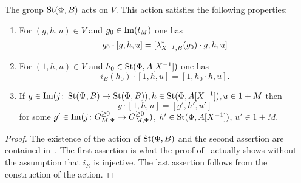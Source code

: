 \begin{prop} \label{prop:horrocks-main} The group $\operatorname{St}(\Phi, B)$ acts on $\overline{V}$.
This action satisfies the following properties:
\begin{enumerate}
    \item For $(g, h, u) \in V$ and $g_0 \in \operatorname{Im}(t_M)$ one has
    \[g_0 \cdot [g, h, u] = [\lambda_{X^{-1}, B}^* (g_0) \cdot g, h, u]\]
    \item For $(1, h, u) \in V$ and $h_0 \in \operatorname{St}(\Phi, A[X^{-1}])$ one has
    \[ i_B(h_0) \cdot [1, h, u] = [1, h_0 \cdot h, u].\]
    \item If $g \in \operatorname{Im}(j\colon \operatorname{St}(\Psi, B) \to \operatorname{St}(\Phi, B)), h \in \operatorname{St}(\Phi, A[X^{-1}]), u \in 1 + M$ then
    \[ g \cdot [1, h, u] = [g', h', u']\] for some $g' \in \operatorname{Im}(j\colon G_{M, \Psi}^{\geq 0} \to G_{M, \Phi}^{\geq 0})$, $h' \in \operatorname{St}(\Phi, A[X^{-1}])$, $u'\in 1 + M$.
\end{enumerate}
\end{prop}
\begin{proof}
    The existence of the action of $\operatorname{St}(\Phi, B)$ and the second assertion are contained in~\cite[Proposition~5.39]{LS20}.
    The first assertion is what the proof of~\cite[Lemma~5.41]{LS20} actually shows without the assumption that $i_R$ is injective.
    The last assertion follows from the construction of the action. %
\end{proof}

